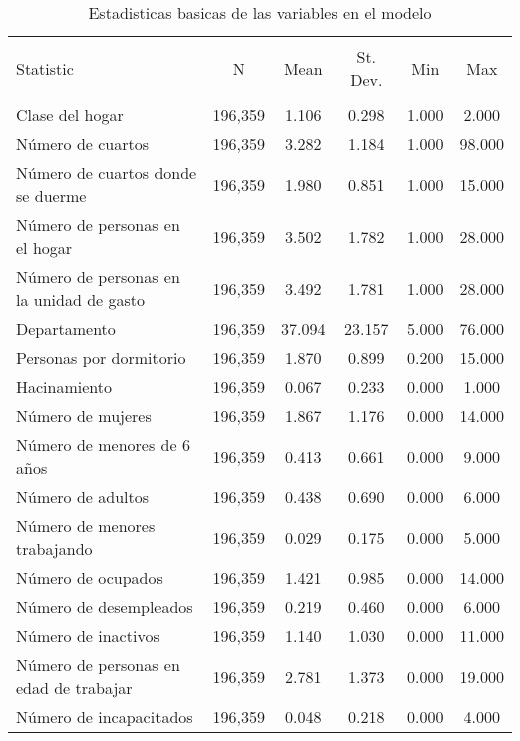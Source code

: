 
\begin{table}[!htbp] \centering 
  \caption{Estadisticas basicas de las variables en el modelo} 
  \label{} 
\begin{tabular}{@{\extracolsep{5pt}}lccccc} 
\\[-1.8ex]\hline 
\hline \\[-1.8ex] 
Statistic & \multicolumn{1}{c}{N} & \multicolumn{1}{c}{Mean} & \multicolumn{1}{c}{St. Dev.} & \multicolumn{1}{c}{Min} & \multicolumn{1}{c}{Max} \\ 
\hline \\[-1.8ex] 
Clase del hogar & 196,359 & 1.106 & 0.298 & 1.000 & 2.000 \\ 
Número de cuartos & 196,359 & 3.282 & 1.184 & 1.000 & 98.000 \\ 
Número de cuartos donde se duerme & 196,359 & 1.980 & 0.851 & 1.000 & 15.000 \\ 
Número de personas en el hogar & 196,359 & 3.502 & 1.782 & 1.000 & 28.000 \\ 
Número de personas en la unidad de gasto & 196,359 & 3.492 & 1.781 & 1.000 & 28.000 \\ 
Departamento & 196,359 & 37.094 & 23.157 & 5.000 & 76.000 \\ 
Personas por dormitorio & 196,359 & 1.870 & 0.899 & 0.200 & 15.000 \\ 
Hacinamiento & 196,359 & 0.067 & 0.233 & 0.000 & 1.000 \\ 
Número de mujeres & 196,359 & 1.867 & 1.176 & 0.000 & 14.000 \\ 
Número de menores de 6 años & 196,359 & 0.413 & 0.661 & 0.000 & 9.000 \\ 
Número de adultos & 196,359 & 0.438 & 0.690 & 0.000 & 6.000 \\ 
Número de menores trabajando & 196,359 & 0.029 & 0.175 & 0.000 & 5.000 \\ 
Número de ocupados & 196,359 & 1.421 & 0.985 & 0.000 & 14.000 \\ 
Número de desempleados & 196,359 & 0.219 & 0.460 & 0.000 & 6.000 \\ 
Número de inactivos & 196,359 & 1.140 & 1.030 & 0.000 & 11.000 \\ 
Número de personas en edad de trabajar & 196,359 & 2.781 & 1.373 & 0.000 & 19.000 \\ 
Número de incapacitados & 196,359 & 0.048 & 0.218 & 0.000 & 4.000 \\ 

\end{tabular}
\end{table}

